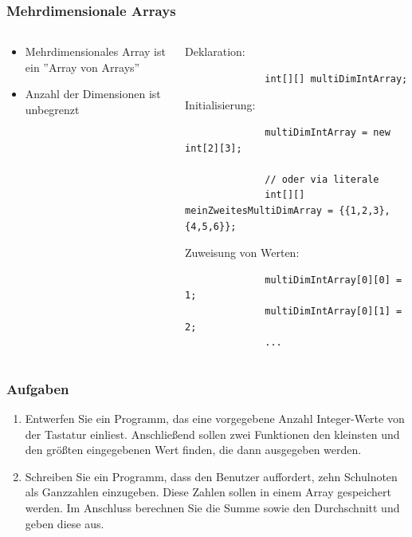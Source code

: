 \begin{frame}[fragile]
	  \frametitle{Mehrdimensionale Arrays}
	   \begin{columns}
		 \begin{column}{0.5\textwidth}
			  \small
			  \begin{itemize}
			    \item Mehrdimensionales Array ist ein 
			    ''Array von Arrays''
			    \item Anzahl der Dimensionen ist unbegrenzt
			  \end{itemize}
	  	\end{column}
	  	\begin{column}{0.5\textwidth}
	  	 \small
			  Deklaration:\\
			  \begin{lstlisting}
			  int[][] multiDimIntArray;
			  \end{lstlisting}
			  
			  Initialisierung:\\
			  \begin{lstlisting}
			  multiDimIntArray = new int[2][3];
			  
			  // oder via literale
			  int[][] meinZweitesMultiDimArray = {{1,2,3},{4,5,6}};
			  \end{lstlisting}
			  
			  
			  Zuweisung von Werten:\\
			  \begin{lstlisting}
			  multiDimIntArray[0][0] = 1;
			  multiDimIntArray[0][1] = 2;
			  ...
			  \end{lstlisting}
	  	\end{column}
	  \end{columns}
\end{frame}

\begin{frame}
	\frametitle{Aufgaben}
	\begin{enumerate}
	  \item Entwerfen Sie ein Programm, das eine vorgegebene Anzahl Integer-Werte
	  		von der Tastatur einliest. Anschließend sollen zwei Funktionen den
	  		kleinsten und den größten eingegebenen Wert finden, die dann ausgegeben
	  		werden.
	  \item Schreiben Sie ein Programm, dass den Benutzer auffordert, zehn
	  		Schulnoten als Ganzzahlen einzugeben. Diese Zahlen sollen in einem Array
	  		gespeichert werden. Im Anschluss berechnen Sie die Summe
	  		sowie den Durchschnitt und geben diese aus.
	\end{enumerate}
\end{frame}

